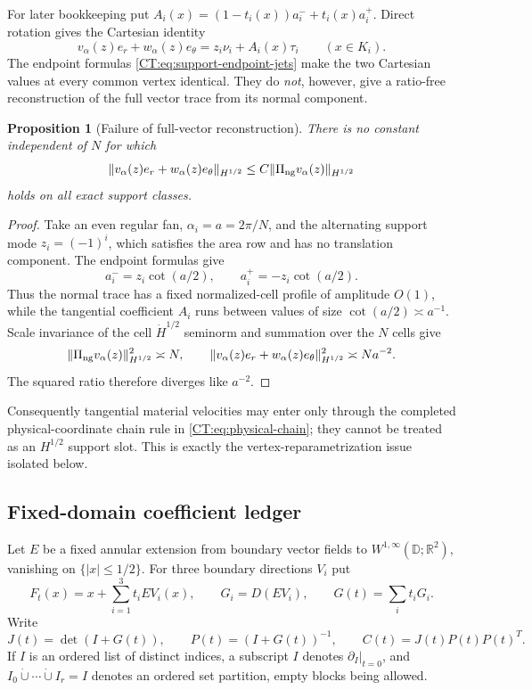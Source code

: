 \documentclass[11pt]{amsart}
\numberwithin{equation}{section}
\newtheorem{proposition}[theorem]{Proposition}
\theoremstyle{definition}
\theoremstyle{remark}
\newcommand{\PiNG}{\Pi_{\rm ng}}
\begin{document}
For later bookkeeping put
$A_i(x)=(1-t_i(x))a_i^-+t_i(x)a_i^+$.  Direct rotation gives the Cartesian
identity
\begin{equation}\label{CT:eq:cartesian-support-trace}
 v_\alpha(z)e_r+w_\alpha(z)e_\theta
 =z_i\nu_i+A_i(x)\tau_i\qquad(x\in K_i).
\end{equation}
The endpoint formulas \eqref{CT:eq:support-endpoint-jets} make the two Cartesian
values at every common vertex identical.  They do \emph{not}, however, give
a ratio-free reconstruction of the full vector trace from its normal
component.

\begin{proposition}[Failure of full-vector reconstruction]
\label{CT:prop:no-vector-reconstruction}
There is no constant independent of $N$ for which
\[
 \|v_\alpha(z)e_r+w_\alpha(z)e_\theta\|_{H^{1/2}}
 \le C\|\PiNG v_\alpha(z)\|_{H^{1/2}}
\]
holds on all exact support classes.
\end{proposition}

\begin{proof}
Take an even regular fan, $\alpha_i=a=2\pi/N$, and the alternating support
mode $z_i=(-1)^i$, which satisfies the area row and has no translation
component.  The endpoint formulas give
\[
 a_i^-=z_i\cot(a/2),\qquad a_i^+=-z_i\cot(a/2).
\]
Thus the normal trace has a fixed normalized-cell profile of amplitude
$O(1)$, while the tangential coefficient $A_i$ runs between values of size
$\cot(a/2)\asymp a^{-1}$.  Scale invariance of the cell
$\dot H^{1/2}$ seminorm and summation over the $N$ cells give
\[
 \|\PiNG v_\alpha(z)\|_{H^{1/2}}^2\asymp N,
 \qquad
 \|v_\alpha(z)e_r+w_\alpha(z)e_\theta\|_{H^{1/2}}^2
 \asymp Na^{-2}.
\]
The squared ratio therefore diverges like $a^{-2}$.
\end{proof}

Consequently tangential material velocities may enter only through the
completed physical-coordinate chain rule in \eqref{CT:eq:physical-chain}; they
cannot be treated as an $H^{1/2}$ support slot.  This is exactly the
vertex-reparametrization issue isolated below.

\subsection{Fixed-domain coefficient ledger}

Let $E$ be a fixed annular extension from boundary vector fields to
$W^{1,\infty}(\mathbb D;\mathbb R^2)$, vanishing on $\{|x|\le1/2\}$.
For three boundary directions $V_i$ put
\[
 F_t(x)=x+\sum_{i=1}^3t_iEV_i(x),\qquad
 G_i=D(EV_i),\qquad G(t)=\sum_it_iG_i.
\]
Write
\begin{equation}\label{CT:eq:JC}
 J(t)=\det(I+G(t)),\qquad
 P(t)=(I+G(t))^{-1},\qquad
 C(t)=J(t)P(t)P(t)^T.
\end{equation}
If $I$ is an ordered list of distinct indices, a subscript $I$ denotes
$\partial_I|_{t=0}$, and $I_0\dot\cup\cdots\dot\cup I_r=I$ denotes an
ordered set partition, empty blocks being allowed.
\end{document}
